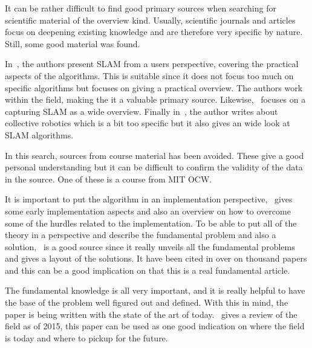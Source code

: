 It can be rather difficult to find good primary sources when searching for
scientific material of the overview kind. Usually, scientific journals and
articles focus on deepening existing knowledge and are therefore very specific
by nature. Still, some good material was found.

In~\cite{Frese2010}, the authors present SLAM from a users perspective, covering
the practical aspects of the algorithms. This is suitable since it does not
focus too much on specific algorithms but focuses on giving a practical
overview. The authors work within the field, making the it a valuable primary
source. Likewise,~\cite{5769022} focuses on a capturing SLAM as a wide overview.
Finally in~\cite{Kernbach20131}, the author writes about collective robotics
which is a bit too specific but it also gives an wide look at SLAM algorithms.

In this search, sources from course material has been avoided. These give a good
personal understanding but it can be difficult to confirm the validity of the
data in the source. One of these is a course from MIT OCW\@.

It is important to put the algorithm in an implementation
perspective,~\cite{844732} gives some early implementation aspects and also an
overview on how to overcome some of the hurdles related to the implementation.
To be able to put all of the theory in a perspective and describe the
fundamental problem and also a solution,~\cite{938381} is a good source since it
really unveils all the fundamental problems and gives a layout of the
solutions. It have been cited in over on thousand papers and this can be a good
implication on that this is a real fundamental article.

The fundamental knowledge is all very important, and it is really helpful to
have the base of the problem well figured out and defined. With this in mind,
the paper is being written with the state of the art of today.~\cite{7482163}
gives a review of the field as of 2015, this paper can be used as one good
indication on where the field is today and where to pickup for the future.
